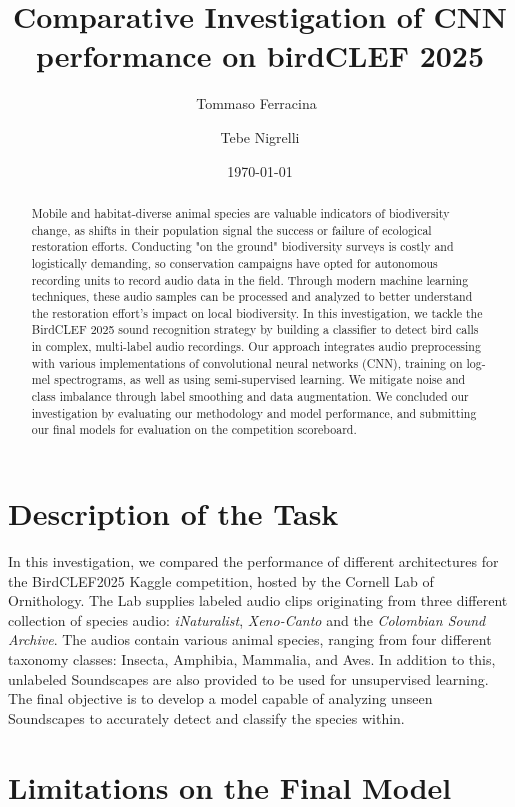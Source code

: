 \documentclass[10pt]{article}
\title{Comparative Investigation of CNN performance on birdCLEF 2025}
\author{
  Tommaso Ferracina\
  \and
  Tebe Nigrelli
}
\date{\today}
\begin{document}
\maketitle

\begin{abstract}
  Mobile and habitat-diverse animal species are valuable indicators of biodiversity change, as shifts in their population signal the success or failure of ecological restoration efforts. Conducting "on the ground" biodiversity surveys is costly and logistically demanding, so conservation campaigns have opted for autonomous recording units to record audio data in the field. Through modern machine learning techniques, these audio samples can be processed and analyzed to better understand the restoration effort's impact on local biodiversity. In this investigation, we tackle the BirdCLEF 2025 sound recognition strategy by building a classifier to detect bird calls in complex, multi-label audio recordings. Our approach integrates audio preprocessing with various implementations of convolutional neural networks (CNN), training on log-mel spectrograms, as well as using semi-supervised learning. We mitigate noise and class imbalance through label smoothing and data augmentation. We concluded our investigation by evaluating our methodology and model performance, and submitting our final models for evaluation on the competition scoreboard.
\end{abstract}

\section*{Description of the Task}

In this investigation, we compared the performance of different architectures for the BirdCLEF2025 Kaggle competition, hosted by the Cornell Lab of Ornithology. The Lab supplies labeled audio clips originating from three different collection of species audio: \textit{iNaturalist}, \textit{Xeno-Canto} and the \textit{Colombian Sound Archive}. The audios contain various animal species, ranging from four different taxonomy classes: Insecta, Amphibia, Mammalia, and Aves. In addition to this, unlabeled Soundscapes are also provided to be used for unsupervised learning. The final objective is to develop a model capable of analyzing unseen Soundscapes to accurately detect and classify the species within.

\section*{Limitations on the Final Model}
\end{document}
